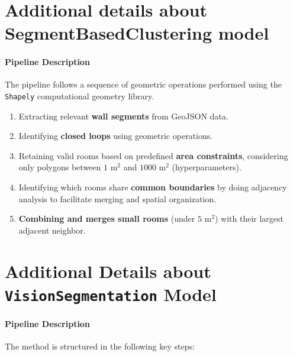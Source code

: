 \documentclass[11pt]{article}
\begin{document}

\section{Additional details about SegmentBasedClustering model}
\label{app:sec:SBCdetails}
\paragraph{Pipeline Description} The pipeline follows a sequence of geometric operations performed using the 
\texttt{Shapely} computational geometry library.

\begin{enumerate}
    \item  Extracting relevant \textbf{wall segments} from GeoJSON data.
    \item Identifying \textbf{closed loops} using geometric operations.
    \item Retaining valid rooms based on predefined \textbf{area constraints}, 
    considering only polygons between $1 \text{ m}^2$ and $1000 \text{ m}^2$ (hyperparameters).
    \item Identifying which rooms share \textbf{common boundaries} by doing adjacency 
    analysis to facilitate merging and spatial organization.
    \item \textbf{Combining and merges small rooms} (under $5 \text{ m}^2$) with their 
    largest adjacent neighbor.
\end{enumerate}

\section{Additional Details about \texttt{VisionSegmentation} Model}
\label{app:sec:CVdetails}
\paragraph{Pipeline Description}
The method is structured in the following key steps:
\end{document}
